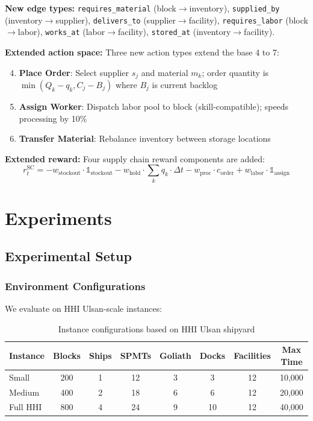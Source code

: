 \documentclass[11pt,a4paper]{article}
\begin{document}
\textbf{New edge types:} \texttt{requires\_material} (block$\to$inventory), \texttt{supplied\_by} (inventory$\to$supplier), \texttt{delivers\_to} (supplier$\to$facility), \texttt{requires\_labor} (block$\to$labor), \texttt{works\_at} (labor$\to$facility), \texttt{stored\_at} (inventory$\to$facility).

\textbf{Extended action space:} Three new action types extend the base 4 to 7:
\begin{enumerate}
    \setcounter{enumi}{3}
    \item[4.] \textbf{Place Order}: Select supplier $s_j$ and material $m_k$; order quantity is $\min(Q_k - q_k, C_j - B_j)$ where $B_j$ is current backlog
    \item[5.] \textbf{Assign Worker}: Dispatch labor pool to block (skill-compatible); speeds processing by 10\%
    \item[6.] \textbf{Transfer Material}: Rebalance inventory between storage locations
\end{enumerate}

\textbf{Extended reward:} Four supply chain reward components are added:
\begin{equation}
r_t^{\text{SC}} = -w_{\text{stockout}} \cdot \mathbb{1}_{\text{stockout}} - w_{\text{hold}} \cdot \sum_k q_k \cdot \Delta t - w_{\text{proc}} \cdot c_{\text{order}} + w_{\text{labor}} \cdot \mathbb{1}_{\text{assign}}
\end{equation}

\section{Experiments}
\label{sec:experiments}

\subsection{Experimental Setup}

\subsubsection{Environment Configurations}

We evaluate on HHI Ulsan-scale instances:

\begin{table}[h]
\centering
\caption{Instance configurations based on HHI Ulsan shipyard}
\label{tab:instances}
\begin{tabular}{lccccccc}
\toprule
Instance & Blocks & Ships & SPMTs & Goliath & Docks & Facilities & Max Time \\
\midrule
Small & 200 & 1 & 12 & 3 & 3 & 12 & 10,000 \\
Medium & 400 & 2 & 18 & 6 & 6 & 12 & 20,000 \\
Full HHI & 800 & 4 & 24 & 9 & 10 & 12 & 40,000 \\
\bottomrule
\end{tabular}
\end{table}
\end{document}
